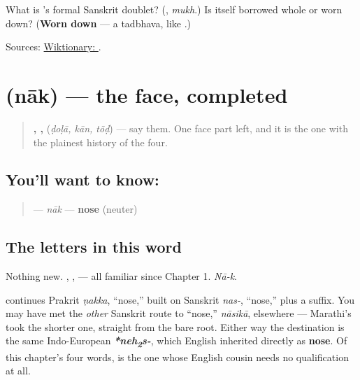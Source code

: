 \begin{tcolorbox}[breakable,colback=teal!4,colframe=teal!35!black,title={Before you move on}]
What is \textbf{}'s formal Sanskrit doublet? (\textbf{}, \emph{mukh}.) Is \textbf{} itself borrowed whole or worn down? (\textbf{Worn down} — a tadbhava, like \textbf{}.)

Sources: \href{https://en.wiktionary.org/wiki/\%E0\%A4\%A4\%E0\%A5\%8B\%E0\%A4\%82\%E0\%A4\%A1}{Wiktionary: }.
\end{tcolorbox}
\section[nāk]{ (nāk) — the face, completed}

\label{lesson:MR-C12-naak}



\begin{quote}
\textbf{, , } (\emph{ḍoḷā, kān, tõḍ}) — say them. One face part left, and it is the one with the plainest history of the four.
\end{quote}

\subsection*{You'll want to know: }
\begin{quote}
\textbf{} — \emph{nāk} — \textbf{nose} (neuter)
\end{quote}

\subsection*{The letters in this word}
Nothing new. \textbf{}, \textbf{}, \textbf{} — all familiar since Chapter 1. \emph{Nā-k}.

\begin{cousinweb}
\textbf{} continues Prakrit \textbf{} \emph{ṇakka}, \textquotedblleft{}nose,\textquotedblright{} built on Sanskrit \textbf{} \emph{nas-}, \textquotedblleft{}nose,\textquotedblright{} plus a suffix. You may have met the \emph{other} Sanskrit route to \textquotedblleft{}nose,\textquotedblright{} \textbf{} \emph{nāsikā}, elsewhere — Marathi's \textbf{} took the shorter one, straight from the bare root. Either way the destination is the same Indo-European \emph{\textbf{*neh\textsubscript{2}s-}}, which English inherited directly as \textbf{nose}. Of this chapter's four words, \textbf{} is the one whose English cousin needs no qualification at all.
\end{cousinweb}

